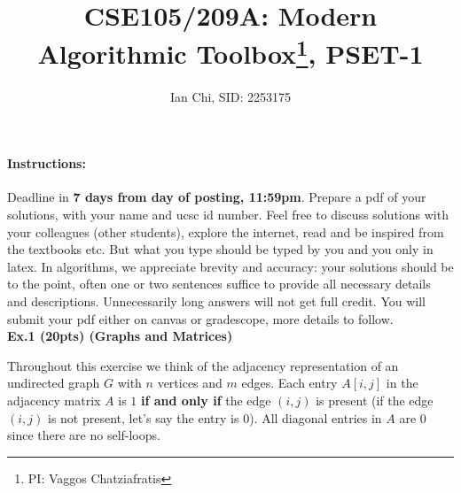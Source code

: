 \documentclass{article}
\title{CSE105/209A: Modern Algorithmic Toolbox\footnote{PI: Vaggos Chatziafratis}, PSET-1\\ }
\author{Ian Chi, SID: 2253175}
\date{}
\begin{document}
\maketitle
\paragraph{Instructions:} Deadline in \textbf{7 days from day of posting, 11:59pm}. Prepare a pdf of your solutions, with your name and ucsc id number. Feel free to discuss solutions with your colleagues (other students), explore the internet, read and be inspired from the textbooks etc. But what you type should be typed by you and you only in latex. In algorithms, we appreciate brevity and accuracy: your solutions should be to the point, often one or two sentences suffice to provide all necessary details and descriptions. Unnecessarily long answers will not get full credit. You will submit your pdf either on canvas or gradescope, more details to follow.\\











\noindent \textbf{Ex.1 (20pts) (Graphs and Matrices)}

Throughout this exercise we think of the adjacency representation of an undirected graph $G$ with $n$ vertices and $m$ edges. Each entry $A[i,j]$ in the adjacency matrix $A$ is $1$ \textbf{if and only if} the edge $(i,j)$ is present (if the edge $(i,j)$ is not present, let's say the entry is 0). All diagonal entries in $A$ are 0 since there are no self-loops.
\end{document}
